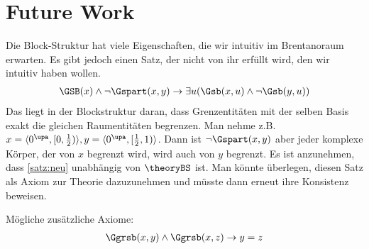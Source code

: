\section{Future Work}
Die Block-Struktur hat viele Eigenschaften, die wir intuitiv im Brentanoraum erwarten. 
Es gibt jedoch einen Satz, der nicht von ihr erfüllt wird, den wir intuitiv haben wollen.
\begin{align}\label{satz:neu}
    \GSB(x) \land \neg \Gspart(x,y) \to \exists u (\Gsb(x,u) \land \neg \Gsb(y,u))
\end{align}
Das liegt in der Blockstruktur daran, dass Grenzentitäten mit der selben Basis exakt die gleichen Raumentitäten begrenzen.
Man nehme z.B. $x= \langle 0^\upa, [0,\frac{1}{2}) \rangle , y = \langle 0^\upa, [\frac{1}{2},1) \rangle$. Dann ist $\neg \Gspart(x,y)$ aber jeder komplexe Körper, der von $x$ begrenzt wird, wird auch von $y$ begrenzt.
Es ist anzunehmen, dass \ref{satz:neu} unabhängig von $\theoryBS$ ist. Man könnte überlegen, diesen Satz als Axiom zur Theorie dazuzunehmen und müsste dann erneut ihre Konsistenz beweisen.

Mögliche zusätzliche Axiome:
\begin{align*}
    \Ggrsb(x,y) \land \Ggrsb(x,z) \to y=z
\end{align*}

